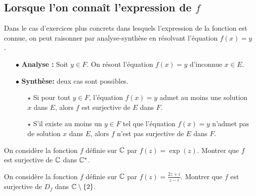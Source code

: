 \documentclass[a4paper, 11pt]{article}
\begin{document}
\subsection{Lorsque l'on conna\^it l'expression de $f$}

\noindent Dans le cas d'exercices plus concrets dans lesquels l'expression de la fonction est connue, on peut raisonner par analyse-synth\`ese en r\'esolvant l'\'equation $f(x)=y$.\\

\begin{itemize}
	\item[$\bullet$] \textbf{Analyse :} Soit $y\in F$. On r\'esout l'\'equation $f(x)=y$ d'inconnue $x \in E$.
	\item[$\bullet$] \textbf{Synth\`{e}se:} deux cas sont possibles.
		\begin{itemize}
			\item[$\star$] Si pour tout $y \in F$, l'\'equation $f(x)=y$ admet au moins une solution $x$ dans $E$, alors $f$ est surjective de $E$ dans $F$.
			\item[$\star$] S'il existe au moins un $y \in F$ tel que l'\'equation $f(x)=y$ n'admet pas de solution $x$ dans $E$, alors $f$ n'est pas surjective de $E$ dans $F$.
		\end{itemize}
\end{itemize}




\begin{exercice}
	On consid\`ere la fonction $f$ d\'efinie sur $\mathbb{C}$ par $f(z)=\exp(z)$. Montrer que $f$ est surjective de $\mathbb{C}$ dans $\mathbb{C}^\star$.
\end{exercice}

\begin{exercice}
	On consid\`ere la fonction $f$ d\'efinie sur $\mathbb{C}$ par $f(z)=\frac{2z+i}{z-i}$. Montrer que $f$ est surjective de $D_f$ dans $\mathbb{C}\setminus\{2\}$.
\end{exercice}


%
\end{document}
